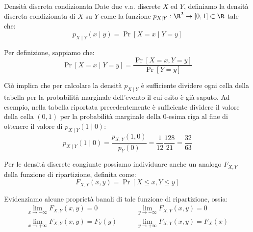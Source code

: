 \documentclass[a4paper, 12pt]{report}
\begin{document}
    \begin{frameddefn}{Densità discreta condizionata}
        Date due v.a. discrete $X$ ed $Y$, definiamo la densità discreta condizionata di $X$ su $Y$ come la funzione $p_{X \mid Y} : \R^2 \to [0,1] \subset \R$ tale che:
        \[p_{X \mid Y}(x \mid y) = \Pr[X=x \mid Y=y]\]
    \end{frameddefn}

    Per definizione, sappiamo che:
    \[\Pr[X = x \mid Y = y] = \frac{\Pr[X = x, Y = y]}{\Pr[Y = y]}\]

    Ciò implica che per calcolare la densità $p_{X \mid Y}$ è sufficiente dividere ogni cella della tabella per la probabilità marginale dell'evento il cui esito è già saputo. Ad esempio, nella tabella riportata precedentemente è sufficiente dividere il valore della cella $(0,1)$ per la probabilità marginale della 0-esima riga al fine di ottenere il valore di $p_{X \mid Y}(1 \mid 0)$:
    \[p_{X \mid Y}(1 \mid 0) = \frac{p_{X,Y}(1,0)}{p_{Y}(0)} = \frac{1}{12} \frac{128}{21} = \frac{32}{63}\]

    Per le densità discrete congiunte possiamo individuare anche un analogo $F_{X,Y}$ della funzione di ripartizione, definita come:
    \[F_{X,Y}(x,y) = \Pr[X \leq x, Y \leq y] \]

    Evidenziamo alcune proprietà banali di tale funzione di ripartizione, ossia:
    \[\begin{split}
        \lim_{x \to -\infty} F_{X,Y}(x,y) = 0 \quad&\quad \lim_{y \to -\infty} F_{X,Y}(x,y) = 0 \\
        \lim_{x \to +\infty} F_{X,Y}(x,y) = F_{Y}(y) \quad&\quad \lim_{y \to +\infty} F_{X,Y}(x,y) = F_X(x) \\
    \end{split}\]
\end{document}
